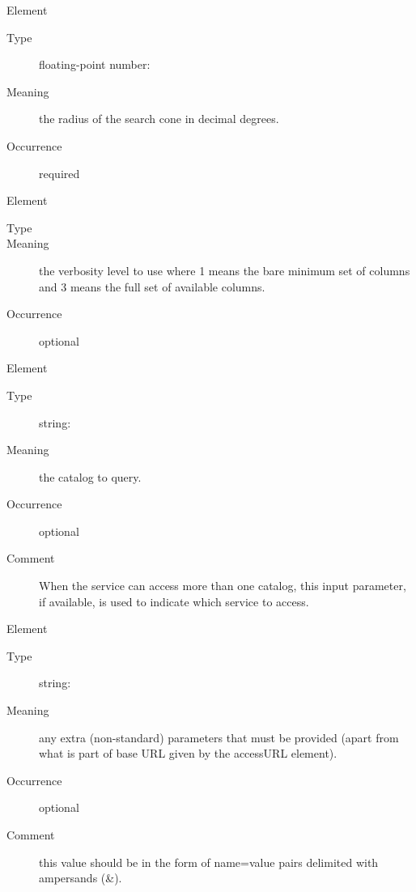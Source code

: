 \documentclass[11pt,a4paper]{ivoa}
\begin{document}
\begin{generated}
\begin{bigdescription}
\begin{description}
\end{description}
\item[Element \xmlel{sr}]
\begin{description}
\item[Type] floating-point number: 
\item[Meaning] 
                   the radius of the search cone in decimal degrees.
               
\item[Occurrence] required

\end{description}
\item[Element \xmlel{verb}]
\begin{description}
\item[Type] 
\item[Meaning] 
                   the verbosity level to use where 1 means the bare
                   minimum set of columns and 3 means the full set of 
                   available columns.
               
\item[Occurrence] optional

\end{description}
\item[Element \xmlel{catalog}]
\begin{description}
\item[Type] string: 
\item[Meaning] 
                   the catalog to query.  
               
\item[Occurrence] optional
\item[Comment] 
                   When the service can access more than one catalog,
                   this input parameter, if available, is used to
                   indicate which service to access.
               

\end{description}
\item[Element \xmlel{extras}]
\begin{description}
\item[Type] string: 
\item[Meaning] 
                   any extra (non-standard) parameters that must be 
                   provided (apart from what is part of base URL given 
                   by the accessURL element).
               
\item[Occurrence] optional
\item[Comment] 
                   this value should be in the form of name=value
                   pairs delimited with ampersands (\&).  
               

\end{description}


\end{bigdescription}\endgroup

\endgroup
\end{generated}
\end{document}
